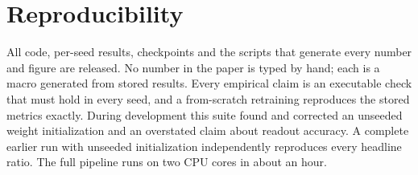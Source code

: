 \documentclass[11pt]{article}
\theoremstyle{definition}\newtheorem{definition}{Definition}
\begin{document}
\section{Reproducibility}\label{app:repro}
All code, per-seed results, checkpoints and the scripts that generate every number and figure are released. No number in the paper is typed by hand; each is a macro generated from stored results. Every empirical claim is an executable check that must hold in every seed, and a from-scratch retraining reproduces the stored metrics exactly. During development this suite found and corrected an unseeded weight initialization and an overstated claim about readout accuracy. A complete earlier run with unseeded initialization independently reproduces every headline ratio. The full pipeline runs on two CPU cores in about an hour.
\end{document}
